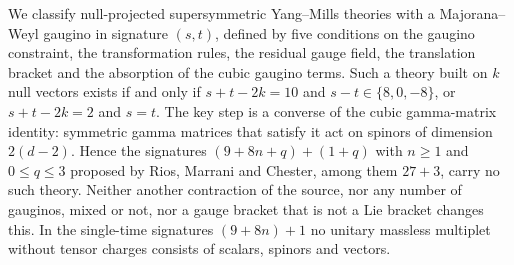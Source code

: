 We classify null-projected supersymmetric Yang--Mills theories with a Majorana--Weyl gaugino in signature $(s,t)$, defined by five conditions on the gaugino constraint, the transformation rules, the residual gauge field, the translation bracket and the absorption of the cubic gaugino terms. Such a theory built on $k$ null vectors exists if and only if $s+t-2k=10$ and $s-t\in\{8,0,-8\}$, or $s+t-2k=2$ and $s=t$. The key step is a converse of the cubic gamma-matrix identity: symmetric gamma matrices that satisfy it act on spinors of dimension $2(d-2)$. Hence the signatures $(9+8n+q)+(1+q)$ with $n\ge1$ and $0\le q\le3$ proposed by Rios, Marrani and Chester, among them $27+3$, carry no such theory. Neither another contraction of the source, nor any number of gauginos, mixed or not, nor a gauge bracket that is not a Lie bracket changes this. In the single-time signatures $(9+8n)+1$ no unitary massless multiplet without tensor charges consists of scalars, spinors and vectors.
